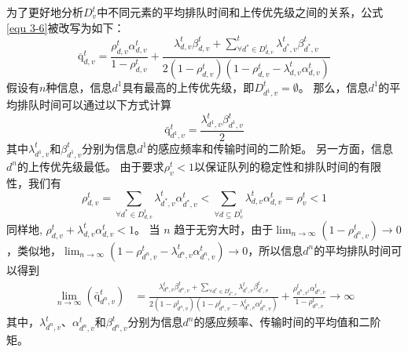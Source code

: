 为了更好地分析$D_v^t$中不同元素的平均排队时间和上传优先级之间的关系，公式\ref{equ 3-6}被改写为如下：
\begin{equation}
\overline{\mathrm{q}}_{d, v}^t=\frac{\rho_{d, v}^t \alpha_{d, v}^t}{1-\rho_{d, v}^t}+\frac{\lambda_{d, v}^t \beta_{d, v}^t+\sum_{\forall d^* \in D_{d, v}^t}^t \lambda_{d^*, v}^t \beta_{d^*, v}^t}{2\left(1-\rho_{d, v}^t\right)\left(1-\rho_{d, v}^t-\lambda_{d, v}^t \alpha_{d, v}^t\right)}
\end{equation}
假设有$n$种信息，信息${d^1}$具有最高的上传优先级，即$D_{d^1, v}^t = \emptyset$。
那么，信息${d^1}$的平均排队时间可以通过以下方式计算
\begin{equation}
\operatorname{\bar{q}}_{d^{1}, v}^t=\frac{\lambda_{d^1, v}^t \beta_{d^1, v}^t}{2}
\end{equation}
其中$\lambda_{d^1, v}^t$和$\beta_{d^1, v}^t$分别为信息$d^1$的感应频率和传输时间的二阶矩。
另一方面，信息${d^n}$的上传优先级最低。
由于要求$\rho_v^t < 1$以保证队列的稳定性和排队时间的有限性，我们有
\begin{equation}
\rho_{d, v}^t=\sum_{\forall d^* \in D_{d, v}^t} \lambda_{d^*, v}^t \alpha_{d^*, v}^t<\sum_{\forall d \subseteq D_v^t} \lambda_{d, v}^t \alpha_{d, v}^t=\rho_v^t<1
\end{equation}
同样地, $\rho_{d, v}^t+\lambda_{d, v}^t \alpha_{d, v}^t<1$。
当 $n$ 趋于无穷大时，由于$\lim _{n \rightarrow \infty}(1-\rho_{d^n, v}^t) \rightarrow 0$，类似地，$\lim _{n \rightarrow \infty}(1-\rho_{d^n, v}^t-\lambda_{d^n, v}^t \alpha_{d^n, v}^t) \rightarrow 0$，所以信息${d^n}$的平均排队时间可以得到
\begin{equation}
\begin{aligned}
	\lim _{n \rightarrow \infty}\left(\mathrm{\bar{q}}_{d^n, v}^t\right)&=\frac{\lambda_{d^n, v}^t \beta_{d^n, v}^t+\sum_{\forall d^* \in D_{d^n, v}^t} \lambda_{d^*, v}^t \beta_{d^*, v}^t}{2\left(1-\rho_{d^n, v}^t\right)\left(1-\rho_{d^n, v}^t-\lambda_{d^n, v}^t \alpha_{d^n, v}^t\right)} + \frac{\rho_{d^n, v^t}^t \alpha_{d^n, v}^t}{1-\rho_{d^n, v}^t}\rightarrow \infty
\end{aligned}
\end{equation}
其中，$\lambda_{d^n, v}^t$、$\alpha_{d^n, v}^t$和$\beta_{d^n, v}^t$分别为信息$d^n$的感应频率、传输时间的平均值和二阶矩。


